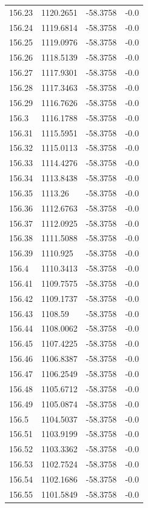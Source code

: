 \begin{table}[H]
\begin{tabular}{llll}
156.23 & 1120.2651 & -58.3758 & -0.0 \\
156.24 & 1119.6814 & -58.3758 & -0.0 \\
156.25 & 1119.0976 & -58.3758 & -0.0 \\
156.26 & 1118.5139 & -58.3758 & -0.0 \\
156.27 & 1117.9301 & -58.3758 & -0.0 \\
156.28 & 1117.3463 & -58.3758 & -0.0 \\
156.29 & 1116.7626 & -58.3758 & -0.0 \\
156.3 & 1116.1788 & -58.3758 & -0.0 \\
156.31 & 1115.5951 & -58.3758 & -0.0 \\
156.32 & 1115.0113 & -58.3758 & -0.0 \\
156.33 & 1114.4276 & -58.3758 & -0.0 \\
156.34 & 1113.8438 & -58.3758 & -0.0 \\
156.35 & 1113.26 & -58.3758 & -0.0 \\
156.36 & 1112.6763 & -58.3758 & -0.0 \\
156.37 & 1112.0925 & -58.3758 & -0.0 \\
156.38 & 1111.5088 & -58.3758 & -0.0 \\
156.39 & 1110.925 & -58.3758 & -0.0 \\
156.4 & 1110.3413 & -58.3758 & -0.0 \\
156.41 & 1109.7575 & -58.3758 & -0.0 \\
156.42 & 1109.1737 & -58.3758 & -0.0 \\
156.43 & 1108.59 & -58.3758 & -0.0 \\
156.44 & 1108.0062 & -58.3758 & -0.0 \\
156.45 & 1107.4225 & -58.3758 & -0.0 \\
156.46 & 1106.8387 & -58.3758 & -0.0 \\
156.47 & 1106.2549 & -58.3758 & -0.0 \\
156.48 & 1105.6712 & -58.3758 & -0.0 \\
156.49 & 1105.0874 & -58.3758 & -0.0 \\
156.5 & 1104.5037 & -58.3758 & -0.0 \\
156.51 & 1103.9199 & -58.3758 & -0.0 \\
156.52 & 1103.3362 & -58.3758 & -0.0 \\
156.53 & 1102.7524 & -58.3758 & -0.0 \\
156.54 & 1102.1686 & -58.3758 & -0.0 \\
156.55 & 1101.5849 & -58.3758 & -0.0 \\

\end{tabular}
\end{table}
